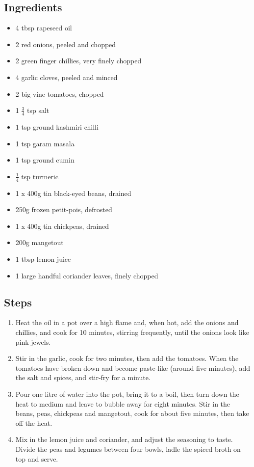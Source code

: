 \documentclass{book}
\begin{document}
\subsection*{Ingredients}
\begin{itemize}
\item 4 tbsp rapeseed oil 
\item 2 red onions, peeled and chopped 
\item 2 green finger chillies, very finely chopped 
\item 4 garlic cloves, peeled and minced 
\item 2 big vine tomatoes, chopped 
\item 1 $\frac{3}{4}$ tsp salt
\item 1 tsp ground kashmiri chilli 
\item 1 tsp garam masala
\item 1 tsp ground cumin 
\item $\frac{1}{4}$ tsp turmeric 
\item 1 x 400g tin black-eyed beans, drained 
\item 250g frozen petit-pois, defrosted 
\item 1 x 400g tin chickpeas, drained 
\item 200g mangetout
\item 1 tbsp lemon juice 
\item 1 large handful coriander leaves, finely chopped 
\end{itemize}

\subsection*{Steps}
\begin{enumerate}
\item Heat the oil in a pot over a high flame and, when hot, add the onions and chillies, and cook for 10 minutes, stirring frequently, until the onions look like pink jewels.
\item Stir in the garlic, cook for two minutes, then add the tomatoes. When the tomatoes have broken down and become paste-like (around five minutes), add the salt and spices, and stir-fry for a minute.
\item Pour one litre of water into the pot, bring it to a boil, then turn down the heat to medium and leave to bubble away for eight minutes. Stir in the beans, peas, chickpeas and mangetout, cook for about five minutes, then take off the heat.
\item Mix in the lemon juice and coriander, and adjust the seasoning to taste. Divide the peas and legumes between four bowls, ladle the spiced broth on top and serve.
\end{enumerate}
\newpage
\end{document}
